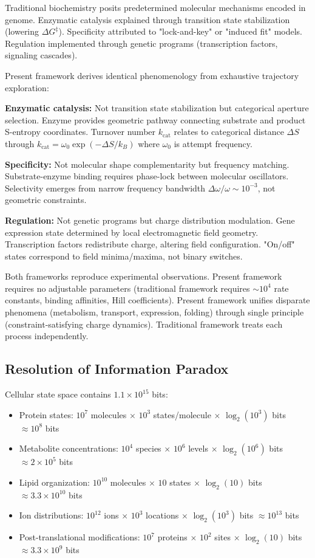 \documentclass[11pt,a4paper]{article}
\theoremstyle{remark}
\begin{document}
Traditional biochemistry posits predetermined molecular mechanisms encoded in genome. Enzymatic catalysis explained through transition state stabilization (lowering $\Delta G^\ddagger$). Specificity attributed to "lock-and-key" or "induced fit" models. Regulation implemented through genetic programs (transcription factors, signaling cascades).

Present framework derives identical phenomenology from exhaustive trajectory exploration:

\textbf{Enzymatic catalysis:} Not transition state stabilization but categorical aperture selection. Enzyme provides geometric pathway connecting substrate and product S-entropy coordinates. Turnover number $k_{\text{cat}}$ relates to categorical distance $\Delta S$ through $k_{\text{cat}} = \omega_0 \exp(-\Delta S/k_B)$ where $\omega_0$ is attempt frequency.

\textbf{Specificity:} Not molecular shape complementarity but frequency matching. Substrate-enzyme binding requires phase-lock between molecular oscillators. Selectivity emerges from narrow frequency bandwidth $\Delta\omega/\omega \sim 10^{-3}$, not geometric constraints.

\textbf{Regulation:} Not genetic programs but charge distribution modulation. Gene expression state determined by local electromagnetic field geometry. Transcription factors redistribute charge, altering field configuration. "On/off" states correspond to field minima/maxima, not binary switches.

Both frameworks reproduce experimental observations. Present framework requires no adjustable parameters (traditional framework requires $\sim 10^4$ rate constants, binding affinities, Hill coefficients). Present framework unifies disparate phenomena (metabolism, transport, expression, folding) through single principle (constraint-satisfying charge dynamics). Traditional framework treats each process independently.

\subsection{Resolution of Information Paradox}

Cellular state space contains $1.1 \times 10^{15}$ bits:
\begin{itemize}
\item Protein states: $10^7$ molecules $\times$ $10^3$ states/molecule $\times$ $\log_2(10^3)$ bits $\approx 10^8$ bits
\item Metabolite concentrations: $10^4$ species $\times$ $10^6$ levels $\times$ $\log_2(10^6)$ bits $\approx 2 \times 10^5$ bits
\item Lipid organization: $10^{10}$ molecules $\times$ $10$ states $\times$ $\log_2(10)$ bits $\approx 3.3 \times 10^{10}$ bits
\item Ion distributions: $10^{12}$ ions $\times$ $10^3$ locations $\times$ $\log_2(10^3)$ bits $\approx 10^{13}$ bits
\item Post-translational modifications: $10^7$ proteins $\times$ $10^2$ sites $\times$ $\log_2(10)$ bits $\approx 3.3 \times 10^9$ bits
\end{itemize}
\end{document}

